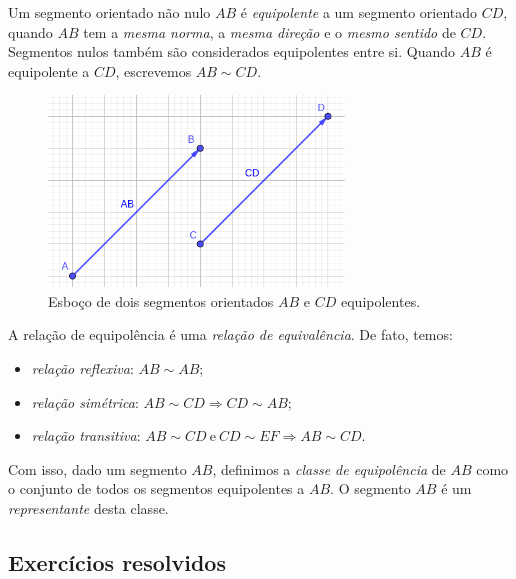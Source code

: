 Um segmento orientado não nulo $AB$ é \emph{equipolente} a um segmento orientado $CD$, quando $AB$ tem a \emph{mesma norma}, a \emph{mesma direção} e o \emph{mesmo sentido} de $CD$. Segmentos nulos também são considerados equipolentes entre si. Quando $AB$ é equipolente a $CD$, escrevemos $AB \sim CD$.

\begin{figure}[H]
  \centering
  \includegraphics[width=0.7\textwidth]{./cap_vetor/dados/fig_segequipolentes/fig_segequipolentes}
  \caption{Esboço de dois segmentos orientados $AB$ e $CD$ equipolentes.}
  \label{fig:segequipolentes}
\end{figure}

A relação de equipolência é uma \emph{relação de equivalência}. De fato, temos:
\begin{itemize}
\item \emph{relação reflexiva}: $AB \sim AB$;
\item \emph{relação simétrica}: $AB \sim CD \Rightarrow CD \sim AB$;
\item \emph{relação transitiva}: $AB \sim CD ~ \text{e} ~ CD \sim EF \Rightarrow AB \sim CD$.
\end{itemize}

Com isso, dado um segmento $AB$, definimos a \emph{classe de equipolência} de $AB$ como o conjunto de todos os segmentos equipolentes a $AB$. O segmento $AB$ é um \emph{representante} desta classe.

\subsection*{Exercícios resolvidos}


